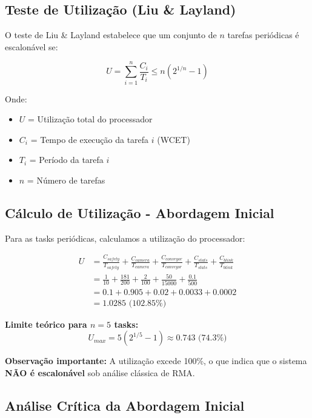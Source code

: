 \documentclass[12pt,a4paper]{article}
\begin{document}
\subsection{Teste de Utilização (Liu \& Layland)}

O teste de Liu \& Layland estabelece que um conjunto de $n$ tarefas periódicas é escalonável se:

\begin{equation}
U = \sum_{i=1}^{n} \frac{C_i}{T_i} \leq n(2^{1/n} - 1)
\end{equation}

Onde:
\begin{itemize}
    \item $U$ = Utilização total do processador
    \item $C_i$ = Tempo de execução da tarefa $i$ (WCET)
    \item $T_i$ = Período da tarefa $i$
    \item $n$ = Número de tarefas
\end{itemize}

\subsection{Cálculo de Utilização - Abordagem Inicial}

Para as tasks periódicas, calculamos a utilização do processador:

\begin{align}
U &= \frac{C_{safety}}{T_{safety}} + \frac{C_{camera}}{T_{camera}} + \frac{C_{conveyor}}{T_{conveyor}} + \frac{C_{stats}}{T_{stats}} + \frac{C_{blink}}{T_{blink}} \\
&= \frac{1}{10} + \frac{181}{200} + \frac{2}{100} + \frac{50}{15000} + \frac{0.1}{500} \\
&= 0.1 + 0.905 + 0.02 + 0.0033 + 0.0002 \\
&= 1.0285 \text{ (102.85\%)}
\end{align}

\textbf{Limite teórico para $n=5$ tasks:}
\begin{equation}
U_{max} = 5(2^{1/5} - 1) \approx 0.743 \text{ (74.3\%)}
\end{equation}

\textbf{Observação importante:} A utilização excede 100\%, o que indica que o sistema \textbf{NÃO é escalonável} sob análise clássica de RMA.

\subsection{Análise Crítica da Abordagem Inicial}
\end{document}
